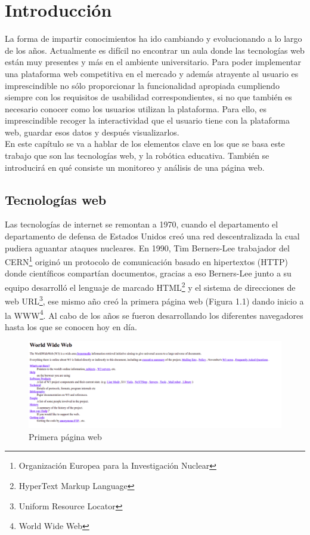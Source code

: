 \chapter{Introducción}
\label{chap:introduccion} 
La forma de impartir conocimientos ha ido cambiando y evolucionando a lo largo de los años. Actualmente es difícil no encontrar un aula donde las tecnologías web están muy presentes y más en el ambiente universitario. Para poder implementar una plataforma web competitiva en el mercado y además atrayente al usuario es imprescindible no sólo proporcionar la funcionalidad apropiada cumpliendo siempre con los requisitos de usabilidad correspondientes, si no que también es necesario conocer como los usuarios utilizan la plataforma. Para ello, es imprescindible recoger la interactividad que el usuario tiene con la plataforma web, guardar esos datos y después visualizarlos.\\

En este capítulo se va a hablar de los elementos clave en los que se basa este trabajo que son las tecnologías web, y la robótica educativa. También se introducirá en qué consiste un monitoreo y análisis de una página web.



\section{Tecnologías web}\label{motivacion}
Las tecnologías de internet se remontan a 1970,  cuando el departamento el departamento de defensa de Estados Unidos creó una red descentralizada la cual pudiera aguantar ataques nucleares. En 1990, Tim Berners-Lee trabajador del CERN\footnote{Organización Europea para​ la Investigación Nuclear} originó un protocolo de comunicación basado en hipertextos (HTTP) donde científicos compartían documentos, gracias a eso Berners-Lee junto a su equipo desarrolló el lenguaje de marcado HTML\footnote{HyperText Markup Language} y el sistema de direcciones de web URL\footnote{Uniform Resource Locator}, ese mismo año creó la primera página web (Figura 1.1) dando inicio a la WWW\footnote{World Wide Web}. Al cabo de los años se fueron desarrollando los diferentes navegadores hasta los que se conocen hoy en día. \\

\begin{figure}[H]
    \centering
    \includegraphics[width=16cm, keepaspectratio]{img/first_web_page.png}
    \caption{Primera página web}
    \label{fig:web}
\end{figure}

